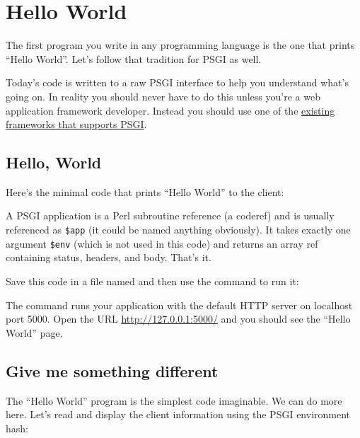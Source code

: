 \chapter{Hello World}\label{day-2-hello-world}

The first program you write in any programming language is the one that
prints ``Hello World''. Let's follow that tradition for PSGI as well.

\begin{note}
  Today's code is written to a raw PSGI interface to help
you understand what's going on. In reality you should never have to do
this unless you're a web application framework developer. Instead you
should use one of the \href{http://plackperl.org/\#frameworks}{existing
frameworks that supports PSGI}.
\end{note}

\section{Hello, World}\label{hello-world}

Here's the minimal code that prints ``Hello World'' to the client:


A PSGI application is a Perl subroutine reference (a coderef) and is
usually referenced as \lstinline!$app! (it could be named anything
obviously). It takes exactly one argument \lstinline!$env! (which is not
used in this code) and returns an array ref containing status, headers,
and body. That's it.

Save this code in a file named  and then use the
 command to run it:


The  command runs your application with the default HTTP server
 on localhost port 5000. Open the URL
\url{http://127.0.0.1:5000/} and you should see the ``Hello World'' page.

\section{Give me something
different}\label{give-me-something-different}

The ``Hello World'' program is the simplest code imaginable. We can do more here. Let's
read and display the client information using the PSGI environment hash:

